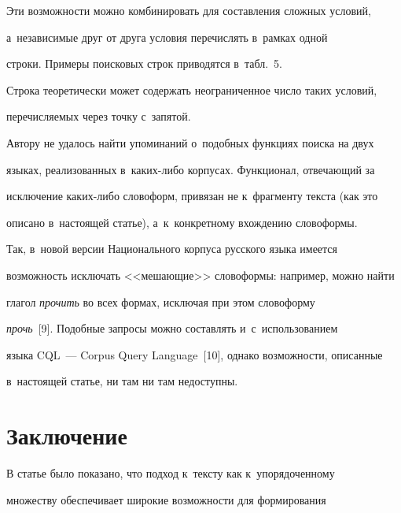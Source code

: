 Эти возможности можно комбинировать для со\-став\-ле\-ния слож\-ных условий, 


а~независимые друг от друга условия пе\-ре\-чис\-лять в~рамках одной 


строки. Примеры поисковых строк приводятся в~табл.~5.











Строка теоретически может содержать неограниченное чис\-ло таких условий, 


пе\-ре\-чис\-ля\-емых через точку с~запятой.





Автору не удалось найти упоминаний о~подобных функциях поиска на двух 


языках, реализованных в~ка\-ких-ли\-бо корпусах. Функционал, от\-ве\-ча\-ющий за 


исключение ка\-ких-ли\-бо словоформ, привязан не к~фрагменту текс\-та (как это 


описано в~на\-сто\-ящей статье), а~к~конкретному вхож\-де\-нию словоформы. 


Так, в~новой версии Национального корпуса русского языка имеется 


воз\-мож\-ность исключать <<ме\-ша\-ющие>> словоформы: например, можно найти 


глагол \textit{прочить} во всех формах, исключая при этом словоформу 


\textit{прочь}~[9]. По\-доб\-ные запросы мож\-но со\-став\-ля\-ть и~с~использованием 


языка CQL~--- Corpus Query Language~[10], однако возможности, описанные 


в~на\-сто\-ящей \mbox{статье}, ни там ни там не\-до\-ступны.








\section{Заключение}





В статье было показано, что подход к~тексту как к~упорядоченному 


множеству обеспечивает широкие возможности для формирования 


